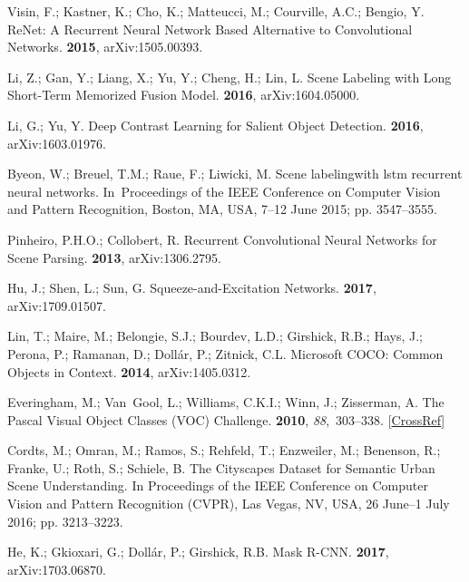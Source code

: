 \documentclass[sensors,article,accept,moreauthors,pdftex]{Definitions/mdpi}
\begin{document}
\begin{thebibliography}{999}
Visin, F.; Kastner, K.; Cho, K.; Matteucci, M.; Courville, A.C.; Bengio, Y.
\newblock ReNet: {A} Recurrent Neural Network Based Alternative to
Convolutional Networks.
 {\bf 2015}, arXiv:1505.00393.

Li, Z.; Gan, Y.; Liang, X.; Yu, Y.; Cheng, H.; Lin, L.
 Scene Labeling with Long Short-Term Memorized Fusion Model.
 {\bf 2016}, arXiv:1604.05000.

Li, G.; Yu, Y.
\newblock Deep Contrast Learning for Salient Object Detection.
 {\bf 2016}, arXiv:1603.01976.

Byeon, W.; Breuel, T.M.; Raue, F.; Liwicki, M.
\newblock Scene labelingwith lstm recurrent neural networks.
\newblock In~Proceedings of the IEEE Conference on Computer Vision and Pattern
Recognition,  Boston, MA, USA,  7--12 June  2015; pp. 3547--3555.

Pinheiro, P.H.O.; Collobert, R.
\newblock Recurrent Convolutional Neural Networks for Scene Parsing.
 {\bf 2013}, arXiv:1306.2795.

Hu, J.; Shen, L.; Sun, G.
\newblock Squeeze-and-Excitation Networks.
 {\bf 2017}, arXiv:1709.01507.

Lin, T.; Maire, M.; Belongie, S.J.; Bourdev, L.D.; Girshick, R.B.; Hays, J.;
Perona, P.; Ramanan, D.; Doll{\'{a}}r, P.; Zitnick, C.L.
\newblock Microsoft {COCO:} Common Objects in Context.
 {\bf 2014}, arXiv:1405.0312.

Everingham, M.; Van~Gool, L.; Williams, C.K.I.; Winn, J.; Zisserman, A.
\newblock The Pascal Visual Object Classes (VOC) Challenge.
 {\bf 2010}, {\em
88},~303--338. [\href{http://dx.doi.org/10.1007/s11263-009-0275-4}{CrossRef}]

\newpage

Cordts, M.; Omran, M.; Ramos, S.; Rehfeld, T.; Enzweiler, M.; Benenson, R.;
Franke, U.; Roth, S.; Schiele, B.
\newblock The Cityscapes Dataset for Semantic Urban Scene Understanding.
\newblock  In Proceedings of the  IEEE Conference on Computer Vision and Pattern
Recognition (CVPR),  Las Vegas, NV, USA, 26 June--1 July 2016; pp. 3213--3223. 

He, K.; Gkioxari, G.; Doll{\'{a}}r, P.; Girshick, R.B.
\newblock Mask {R-CNN}.
 {\bf 2017}, arXiv:1703.06870.

\end{thebibliography}
\end{document}

